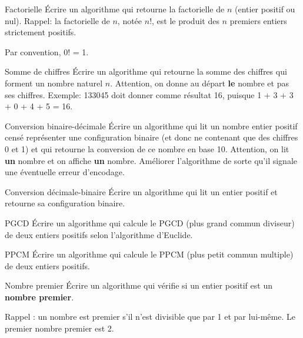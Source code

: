 \begin{Exercice}{Factorielle}
	Écrire un algorithme qui retourne la factorielle de $n$ (entier positif ou
	nul). Rappel: la factorielle de $n$, notée $n$!, est le produit des $n$
	premiers entiers strictement positifs. 
	
	Par convention, 0! = 1.
\end{Exercice}

\begin{Exercice}{Somme de chiffres}
	Écrire un algorithme qui retourne la somme des chiffres qui forment un
	nombre naturel $n$. Attention, on donne au départ \textbf{le} nombre et
	pas ses chiffres. Exemple: 133045 doit donner comme résultat 16,
	puisque 1 + 3 + 3 + 0 + 4 + 5 = 16.
\end{Exercice}

\begin{Exercice}{Conversion binaire-décimale}
	Écrire un algorithme qui lit un nombre entier positif censé représenter
	une configuration binaire (et donc ne contenant que des chiffres 0 et
	1) et qui retourne la conversion de ce nombre en base 10. Attention, on
	lit \textbf{un} nombre et on affiche \textbf{un} nombre. Améliorer
	l’algorithme de sorte qu’il signale une éventuelle erreur d’encodage.
\end{Exercice}

\begin{Exercice}{Conversion décimale-binaire}
	Écrire un algorithme qui lit un entier positif et retourne sa
	configuration binaire.
\end{Exercice}

\begin{Exercice}{PGCD}
	Écrire un algorithme qui calcule le PGCD (plus grand commun diviseur) de
	deux entiers positifs selon l’algorithme d’Euclide.
\end{Exercice}

\begin{Exercice}{PPCM}
	Écrire un algorithme qui calcule le PPCM (plus petit commun multiple) de
	deux entiers positifs.
\end{Exercice}

\begin{Exercice}{Nombre premier}
	Écrire un algorithme qui vérifie si un entier positif est un
	\textbf{nombre premier}. 
	
	Rappel : un nombre est premier s’il n’est divisible que par 1 et par
	lui-même. Le premier nombre premier est 2.
\end{Exercice}

